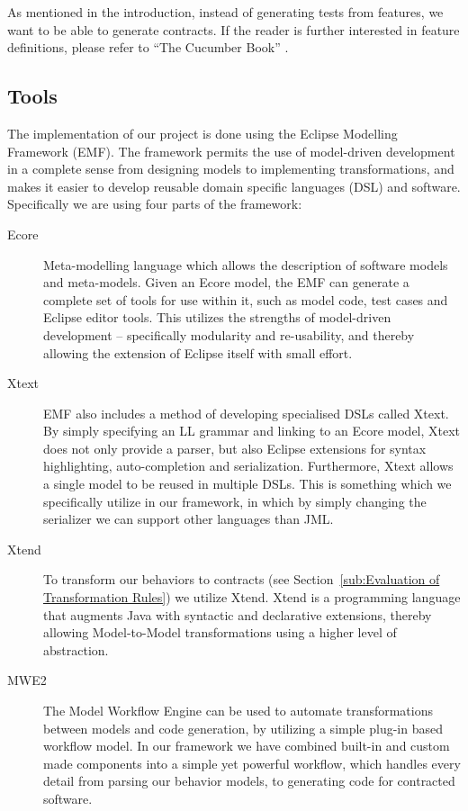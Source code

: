 As mentioned in the introduction, instead of generating tests from features, we want to be able to generate contracts. 
If the reader is further interested in feature definitions, please refer to “The Cucumber Book” \cite{hellesoy2012}.


\subsection{Tools}
The implementation of our project is done using the Eclipse Modelling Framework (EMF).
The framework permits the use of model-driven development in a complete sense from designing models to implementing transformations, and makes
it easier to develop reusable domain specific languages (DSL) and software. Specifically we are using four parts of the framework:
\begin{description}
\item[Ecore] Meta-modelling language which allows the description of software models and meta-models. Given an Ecore model, the EMF can
  generate a complete set of tools for use within it, such as model code, test cases and Eclipse editor tools. This utilizes the strengths
  of model-driven development -- specifically modularity and re-usability, and thereby allowing the extension of Eclipse itself with small effort.
\item[Xtext] EMF also includes a method of developing specialised DSLs called Xtext. By simply specifying an LL grammar and linking to an Ecore model,
  Xtext does not only provide a parser, but also Eclipse extensions for syntax highlighting, auto-completion and serialization.
  Furthermore, Xtext allows a single model to be reused in multiple DSLs. This is something which we specifically utilize in our framework,
  in which by simply changing the serializer we can support other languages than JML.
\item[Xtend] To transform our behaviors to contracts (see Section~\ref{sub:Evaluation of Transformation Rules}) we utilize Xtend.
  Xtend is a programming language that augments Java with syntactic and declarative extensions, thereby allowing Model-to-Model transformations using a higher level of abstraction.
\item[MWE2] The Model Workflow Engine can be used to automate transformations between models and code generation, by utilizing a simple plug-in based
  workflow model. In our framework we have combined built-in and custom made components into a simple yet powerful workflow, which handles every detail
  from parsing our behavior models, to generating code for contracted software.
\end{description}

